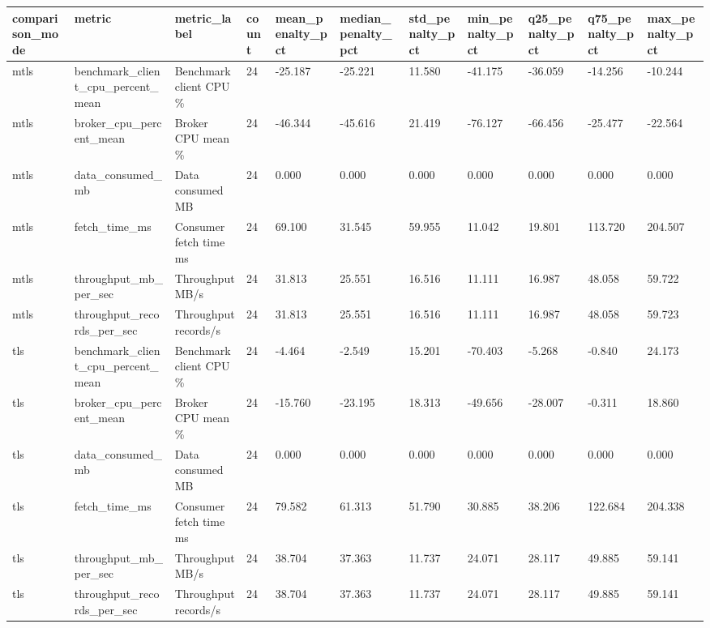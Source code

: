\begin{tabular}{lllllllllll}
\hline
comparison\_mode & metric & metric\_label & count & mean\_penalty\_pct & median\_penalty\_pct & std\_penalty\_pct & min\_penalty\_pct & q25\_penalty\_pct & q75\_penalty\_pct & max\_penalty\_pct \\
\hline
mtls & benchmark\_client\_cpu\_percent\_mean & Benchmark client CPU \% & 24 & -25.187 & -25.221 & 11.580 & -41.175 & -36.059 & -14.256 & -10.244 \\
mtls & broker\_cpu\_percent\_mean & Broker CPU mean \% & 24 & -46.344 & -45.616 & 21.419 & -76.127 & -66.456 & -25.477 & -22.564 \\
mtls & data\_consumed\_mb & Data consumed MB & 24 & 0.000 & 0.000 & 0.000 & 0.000 & 0.000 & 0.000 & 0.000 \\
mtls & fetch\_time\_ms & Consumer fetch time ms & 24 & 69.100 & 31.545 & 59.955 & 11.042 & 19.801 & 113.720 & 204.507 \\
mtls & throughput\_mb\_per\_sec & Throughput MB/s & 24 & 31.813 & 25.551 & 16.516 & 11.111 & 16.987 & 48.058 & 59.722 \\
mtls & throughput\_records\_per\_sec & Throughput records/s & 24 & 31.813 & 25.551 & 16.516 & 11.111 & 16.987 & 48.058 & 59.723 \\
tls & benchmark\_client\_cpu\_percent\_mean & Benchmark client CPU \% & 24 & -4.464 & -2.549 & 15.201 & -70.403 & -5.268 & -0.840 & 24.173 \\
tls & broker\_cpu\_percent\_mean & Broker CPU mean \% & 24 & -15.760 & -23.195 & 18.313 & -49.656 & -28.007 & -0.311 & 18.860 \\
tls & data\_consumed\_mb & Data consumed MB & 24 & 0.000 & 0.000 & 0.000 & 0.000 & 0.000 & 0.000 & 0.000 \\
tls & fetch\_time\_ms & Consumer fetch time ms & 24 & 79.582 & 61.313 & 51.790 & 30.885 & 38.206 & 122.684 & 204.338 \\
tls & throughput\_mb\_per\_sec & Throughput MB/s & 24 & 38.704 & 37.363 & 11.737 & 24.071 & 28.117 & 49.885 & 59.141 \\
tls & throughput\_records\_per\_sec & Throughput records/s & 24 & 38.704 & 37.363 & 11.737 & 24.071 & 28.117 & 49.885 & 59.141 \\
\hline
\end{tabular}
